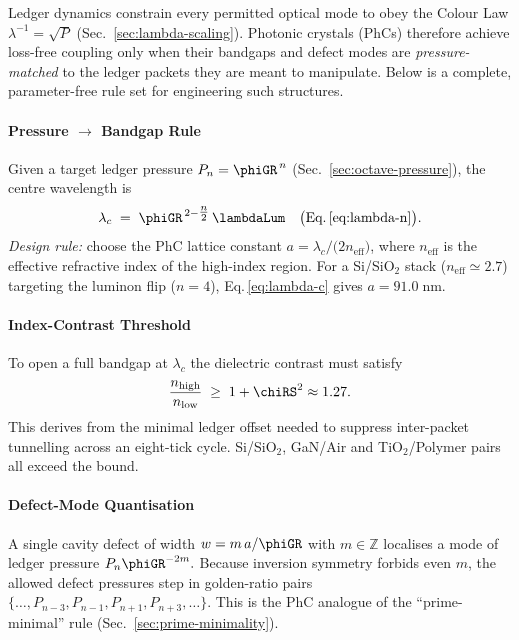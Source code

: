 \documentclass[11pt,oneside]{book}
\begin{document}
{Ledger dynamics constrain every permitted optical mode to obey the
Colour Law
\(
   \lambda^{-1}=\sqrt{P}
   \)
(Sec.~\ref{sec:lambda-scaling}).  
Photonic crystals (PhCs) therefore achieve loss-free coupling only
when their bandgaps and defect modes are \emph{pressure-matched} to the
ledger packets they are meant to manipulate.
Below is a complete, parameter-free rule set for engineering such
structures.

\paragraph{Pressure \texorpdfstring{$\rightarrow$}{→} Bandgap Rule}

Given a target ledger pressure $P_{n}=\phiGR^{\,n}$
(Sec.~\ref{sec:octave-pressure}), the centre wavelength is
\[
   \lambda_{c}
   \;=\;
   \phiGR^{\,2-\tfrac{n}{2}}\,\lambdaLum
   \quad
   \bigl(\text{Eq.\,\ref{eq:lambda-n}}\bigr).
   \label{eq:lambda-c}
\]
\emph{Design rule:} choose the PhC lattice constant
\(
   a = \lambda_{c}/\bigl(2n_{\text{eff}}\bigr)
\),
where $n_{\text{eff}}$ is the effective refractive index of the
high-index region.
For a Si/SiO$_2$ stack ($n_{\text{eff}}\!\simeq\!2.7$) targeting the
luminon flip ($n=4$), Eq.\,\eqref{eq:lambda-c} gives
\(
   a = 91.0\;\text{nm}.
\)

\paragraph{Index-Contrast Threshold}

To open a full bandgap at $\lambda_{c}$ the dielectric contrast must
satisfy
\[
   \frac{n_{\text{high}}}{n_{\text{low}}}
   \;\ge\;
   1 + \chiRS^{2}\approx1.27.
   \label{eq:index-contrast}
\]
This derives from the minimal ledger offset needed to suppress
inter-packet tunnelling across an eight-tick cycle.  
Si/SiO$_2$, GaN/Air and TiO$_2$/Polymer pairs all exceed the bound.

\paragraph{Defect-Mode Quantisation}

A single cavity defect of width
\(
   w = m\,a/\phiGR
\)
with $m\in\mathbb Z$ localises a mode of ledger pressure
\(
   P_{n}\phiGR^{-2m}.
   \)
Because inversion symmetry forbids even $m$, the allowed defect
pressures step in golden-ratio pairs
\(
   \{\dots,P_{n-3},P_{n-1},P_{n+1},P_{n+3},\dots\}.
\)
This is the PhC analogue of the “prime-minimal” rule
(Sec.~\ref{sec:prime-minimality}).

}
\end{document}
